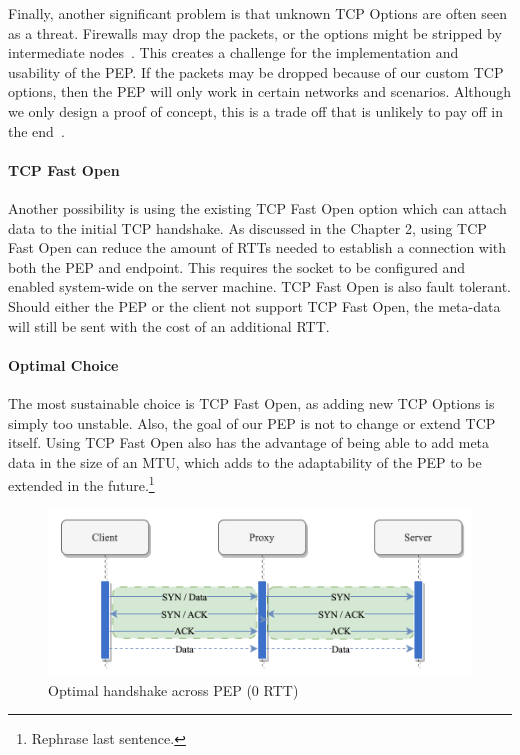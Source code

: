 \documentclass[a4paper,english, 11pt]{report}
\begin{document}
Finally, another significant problem is that unknown TCP Options are often seen as a threat. Firewalls may drop the packets, or the options might be stripped by intermediate nodes~\cite{middlebox_interactions}. This creates a challenge for the implementation and usability of the PEP. If the packets may be dropped because of our custom TCP options, then the PEP will only work in certain networks and scenarios. Although we only design a proof of concept, this is a trade off that is unlikely to pay off in the end~\cite{tcp_extendable}.

\paragraph{TCP Fast Open}
Another possibility is using the existing TCP Fast Open option which can attach data to the initial TCP handshake. As discussed in the Chapter 2, using TCP Fast Open can reduce the amount of RTTs needed to establish a connection with both the PEP and endpoint. This requires the socket to be configured and enabled system-wide on the server machine. TCP Fast Open is also fault tolerant. Should either the PEP or the client not support TCP Fast Open, the meta-data will still be sent with the cost of an additional RTT. 

\paragraph{Optimal Choice}
The most sustainable choice is TCP Fast Open, as adding new TCP Options is simply too unstable. Also, the goal of our PEP is not to change or extend TCP itself. Using TCP Fast Open also has the advantage of being able to add meta data in the size of an MTU, which adds to the adaptability of the PEP to be extended in the future.\footnote{Rephrase last sentence.}\\

\begin{figure} %
	\centering
	\includegraphics[scale=0.75]{../diagrams/drawio/tcphandshake_optimal.png}
  	\caption{Optimal handshake across PEP (0 RTT)}
  	\label{fig:tcphandshake_optimal}
\end{figure}
\end{document}
